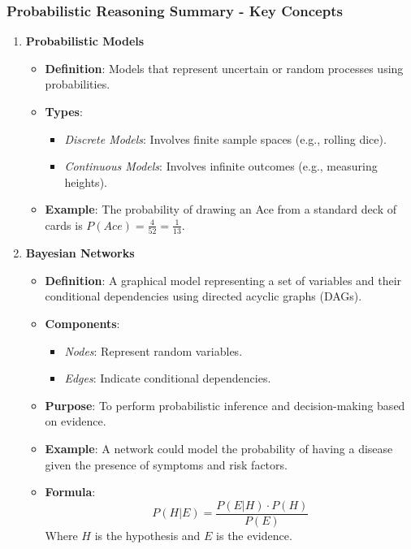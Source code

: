 \documentclass[aspectratio=169]{beamer}
\begin{document}
\begin{frame}[fragile]
  \frametitle{Probabilistic Reasoning Summary - Key Concepts}
  \begin{enumerate}
    \item \textbf{Probabilistic Models}
      \begin{itemize}
        \item \textbf{Definition}: Models that represent uncertain or random processes using probabilities.
        \item \textbf{Types}:
          \begin{itemize}
            \item \textit{Discrete Models}: Involves finite sample spaces (e.g., rolling dice).
            \item \textit{Continuous Models}: Involves infinite outcomes (e.g., measuring heights).
          \end{itemize}
        \item \textbf{Example}: The probability of drawing an Ace from a standard deck of cards is \( P(Ace) = \frac{4}{52} = \frac{1}{13} \).
      \end{itemize}

    \item \textbf{Bayesian Networks}
      \begin{itemize}
        \item \textbf{Definition}: A graphical model representing a set of variables and their conditional dependencies using directed acyclic graphs (DAGs).
        \item \textbf{Components}:
          \begin{itemize}
            \item \textit{Nodes}: Represent random variables.
            \item \textit{Edges}: Indicate conditional dependencies.
          \end{itemize}
        \item \textbf{Purpose}: To perform probabilistic inference and decision-making based on evidence.
        \item \textbf{Example}: A network could model the probability of having a disease given the presence of symptoms and risk factors.
        \item \textbf{Formula}:
          \begin{equation}
          P(H|E) = \frac{P(E|H) \cdot P(H)}{P(E)}
          \end{equation}
          Where \( H \) is the hypothesis and \( E \) is the evidence.
      \end{itemize}
  \end{enumerate}
\end{frame}
\end{document}
